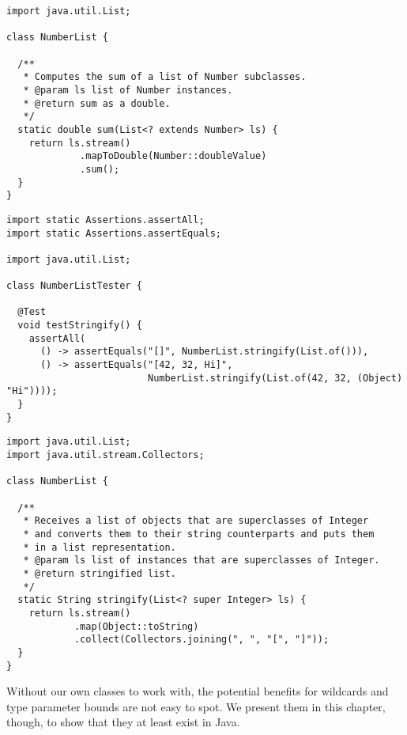 \begin{cl}[]{}
\begin{lstlisting}[language=MyJava]
import java.util.List;

class NumberList {

  /**
   * Computes the sum of a list of Number subclasses.
   * @param ls list of Number instances.
   * @return sum as a double.
   */
  static double sum(List<? extends Number> ls) {
    return ls.stream()
             .mapToDouble(Number::doubleValue)
             .sum();
  }
}
\end{lstlisting}
\end{cl}


\begin{cl}[]{}
\begin{lstlisting}[language=MyJava]
import static Assertions.assertAll;
import static Assertions.assertEquals;

import java.util.List;

class NumberListTester {

  @Test
  void testStringify() {
    assertAll(
      () -> assertEquals("[]", NumberList.stringify(List.of())),
      () -> assertEquals("[42, 32, Hi]",
                         NumberList.stringify(List.of(42, 32, (Object) "Hi"))));
  }
}
\end{lstlisting}
\end{cl}

\begin{cl}[]{}
\begin{lstlisting}[language=MyJava]
import java.util.List;
import java.util.stream.Collectors;

class NumberList {

  /**
   * Receives a list of objects that are superclasses of Integer
   * and converts them to their string counterparts and puts them
   * in a list representation.
   * @param ls list of instances that are superclasses of Integer.
   * @return stringified list.
   */
  static String stringify(List<? super Integer> ls) {
    return ls.stream()
            .map(Object::toString)
            .collect(Collectors.joining(", ", "[", "]"));
  }
}
\end{lstlisting}
\end{cl}

Without our own classes to work with, the potential benefits for wildcards and type parameter bounds are not easy to spot. We present them in this chapter, though, to show that they at least exist in Java.
